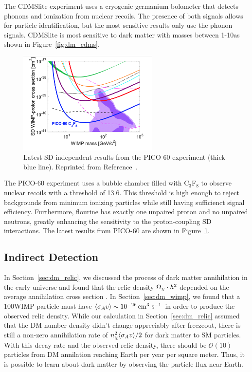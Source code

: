 The CDMSlite experiment uses a cryogenic germanium bolometer that detects phonons and ionization from nuclear recoils.
The presence of both signals allows for particle identification, but the most sensitive results only use the phonon signals.
CDMSlite is most sensitive to dark matter with masses between 1-10\GeV as shown in Figure~\ref{fig:dm_cdms}.

\begin{figure}[htbp]
  \centering
  \includegraphics[width=0.625\textwidth]{DarkMatter/Figures/pico.png}
  \caption{
    Latest SD independent results from the PICO-60 experiment (thick blue line).
    Reprinted from Reference~\cite{}. %
  }
  \label{fig:dm_pico}
\end{figure}

The PICO-60 experiment uses a bubble chamber filled with C$_3$F$_8$ to observe nuclear recoils with a threshold of 13.6\keV.
This threshold is high enough to reject backgrounds from minimum ionizing particles while still having sufficienct signal efficiency.
Furthermore, flourine has exactly one unpaired proton and no unpaired neutrons, greatly enhancing the sensitivity to the proton-coupling SD interactions.
The latest results from PICO-60 are shown in Figure~\ref{fig:dm_pico}. 


\subsection{Indirect Detection}
\label{sec:dm_indirect}

In Section~\ref{sec:dm_relic}, we discussed the process of dark matter annihilation in the early universe and found that the relic density $\Omega_\chi \cdot h^2$ depended on the average annihilation cross section \sigmav.
In Section~\ref{sec:dm_wimp}, we found that a 100\GeV WIMP particle must have $\langle \sigma_A v \rangle \sim 10^{-26} \,\text{cm}^{3}\text{ s}^{-1}$ in order to produce the observed relic density.
While our calculation in Section~\ref{sec:dm_relic} assumed that the DM number density didn't change appreciably after freezeout, there is still a non-zero annihilation rate of $n_\chi^2 \langle \sigma_A v \rangle / 2$ for dark matter to SM particles.
With this decay rate and the observed relic density, there should be $\mathcal{O}(10)$ particles from DM annilation reaching Earth per year per square meter. %
Thus, it is possible to learn about dark matter by observing the particle flux near Earth.

